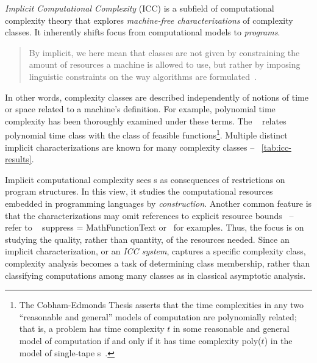 \emph{Implicit Computational Complexity} (ICC) is a subfield of computational
complexity theory that explores \emph{machine-free
characterizations} of complexity classes. It
inherently shifts focus from computational models to
\emph{programs}.
\begin{quotation}
\noindent By implicit, we here mean that classes are not given by constraining
the amount of resources a machine is
allowed to use, but rather by imposing linguistic constraints on the way
algorithms are formulated~\cite[p. 90]{dallago2011}.
\end{quotation}
In other words, complexity classes are described
independently of notions of time or space related to a machine's definition. For
example, polynomial time complexity has been thoroughly examined under
these terms. The ~\cite{cobham1965,edmonds1965}
relates polynomial time class with the class of feasible functions\footnote{The
Cobham-Edmonds Thesis asserts that the time complexities in any two
\enquote{reasonable and general} models of computation are polynomially related;
that is, a problem has time complexity \(t\) in some reasonable and general
model of computation if and only if it has time complexity poly(\(t\)) in the
model of single-tape s~\cite[p. 33]{goldreich2008}.}.
Multiple distinct implicit characterizations are known for many complexity
classes -- \cf~\autoref{tab:icc-results}.

Implicit computational complexity sees s as consequences
of restrictions on program structures. In this view, it studies the
computational resources embedded in programming languages by
\emph{construction}. Another common feature is that the characterizations may
omit references to explicit resource bounds~\cite{moyen2017} -- refer to \eg~%
suppress = MathFunctionText \textcite{bellantoni1992}
or~\textcite{kristiansen2005} for examples. Thus, the focus is on studying the
quality, rather than quantity, of the resources needed. Since an implicit
characterization, or an \emph{ICC system}, captures a specific complexity
class, complexity analysis becomes a task of
determining class membership, rather than classifying computations among many
classes as in classical asymptotic analysis.

